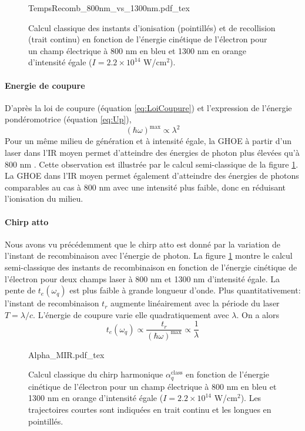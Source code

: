 \begin{figure}[ht]
\centering
\def\svgwidth{0.7\columnwidth}
{TempsRecomb_800nm_vs_1300nm.pdf_tex}
\caption{Calcul classique des instants d'ionisation (pointillés) et de recollision (trait continu) en fonction de l'énergie cinétique de l'électron pour un champ électrique à 800 nm en bleu et 1300 nm en orange d'intensité égale ($I = 2.2 \times 10^{14}$ W/cm$^2$).}
\label{fig:Recomb_vs_Lambda}
\end{figure}

\paragraph{Energie de coupure} D'après la loi de coupure (équation \ref{eq:LoiCoupure}) et l'expression de l'énergie pondéromotrice (équation \ref{eq:Up}),
\begin{equation}
(\hbar \omega)^{\text{max}} \propto \lambda^2
\end{equation}
Pour un même milieu de génération et à intensité égale, la GHOE à partir d'un laser dans l'IR moyen permet d'atteindre des énergies de photon plus élevées qu'à 800 nm .  Cette observation est illustrée par le calcul semi-classique de la figure \ref{fig:Recomb_vs_Lambda}. La GHOE dans l'IR moyen permet également d'atteindre des énergies de photons comparables au cas à 800 nm avec une intensité plus faible, donc en réduisant l'ionisation du milieu.

\paragraph{Chirp atto} Nous avons vu précédemment que le chirp atto est donné par la variation de l'instant de recombinaison avec l'énergie de photon. La figure \ref{fig:Recomb_vs_Lambda} montre le calcul semi-classique des instants de recombinaison en fonction de l'énergie cinétique de l'électron pour deux champs laser à 800 nm et 1300 nm d'intensité égale. La pente de $t_e(\omega_q)$ est plus faible à grande longueur d'onde. Plus quantitativement: l'instant de recombinaison $t_r$ augmente linéairement avec la période du laser $T = \lambda/c$. L'énergie de coupure varie elle quadratiquement avec $\lambda$. On a alors
\begin{equation}
t_e (\omega_q) \propto \frac{t_r}{(\hbar \omega)^{\text{max}}} \propto \frac{1}{\lambda}
\end{equation}

\begin{figure}
\centering
\def\svgwidth{0.7\columnwidth}
{Alpha_MIR.pdf_tex}
\caption{Calcul classique du chirp harmonique $\alpha_q^{\text{class}}$ en fonction de l'énergie cinétique de l'électron pour un champ électrique à 800 nm en bleu et 1300 nm en orange d'intensité égale ($I = 2.2 \times 10^{14}$ W/cm$^2$). Les trajectoires courtes sont indiquées en trait continu et les longues en pointillés.}
\label{fig:AlphaMIR}
\end{figure}


